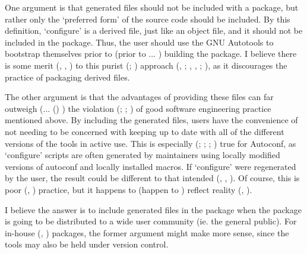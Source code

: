 One argument is that generated files should not be included with a package, but rather only the `preferred form' of the source code should be included. By this definition, `configure' is a derived file, just like an object file, and it should not be included in the package. Thus, the user should use the GNU Autotools to bootstrap themselves prior to (prior to {\MaQ{}}... {\MaQ{}}) building the package. I believe there is some merit ({\McQ{}}, {\MaQ{}}, {\MaQ{}}) to this
purist ({\MhQ{}}; {\MhQ{}}) approach ({\MbQ{}}, {\McQ{}}; {\MfQ{}}, {\MbQ{}}, {\MjQ{}}; {\MdQ{}}),
as it discourages the practice of packaging derived files. 


The other argument is that the advantages of providing these files can far 
outweigh ({\MbQ{}}... {\MbQ{}} ({\MbQ{}}) ) the violation ({\McQ{}}; {\McQ{}}; {\McQ{}}) of good 
software engineering practice mentioned above. By including the generated files,
users have the convenience of not needing to be concerned with keeping up to 
date with all of the different versions of the tools in active use. This is 
especially ({\MbQ{}}; {\MeQ{}}; {\MbQ{}}; {\MaQ{}}) true for Autoconf, as `configure' scripts 
are 
often generated by maintainers using locally modified versions of autoconf and 
locally installed macros. If `configure' were regenerated by the user, the 
result could be different to that intended ({\MbQ{}}, {\McQ{}}, {\MbQ{}}).
Of course, 
this is poor ({\MhQ{}}, {\MAQ{}}) practice, but it happens to (happen to {\MbQ{}})
reflect reality ({\MbQ{}}, {\MbQ{}}). 


I believe the answer is to include generated files in the package when the 
package is going to be distributed to a wide user community
(ie. the general public). For in-house ({\MaQ{}}, {\McQ{}} {\McQ{}}) packages,
the former argument might make more sense, since the tools may also be 
held under version control. 

